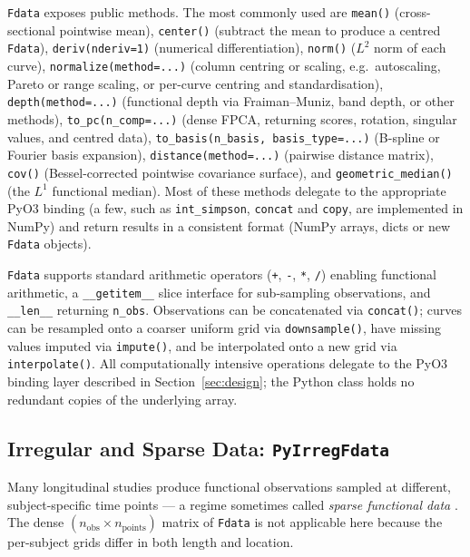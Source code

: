 \texttt{Fdata} exposes \nfdata{} public methods.  The most commonly used are
\texttt{mean()} (cross-sectional pointwise mean), \texttt{center()} (subtract
the mean to produce a centred \texttt{Fdata}), \texttt{deriv(nderiv=1)}
(numerical differentiation), \texttt{norm()} ($L^2$ norm of each curve),
\texttt{normalize(method=...)} (column centring or scaling, e.g.\
autoscaling, Pareto or range scaling, or per-curve centring and
standardisation), \texttt{depth(method=...)}
(functional depth via Fraiman--Muniz, band depth, or other methods),
\texttt{to\_pc(n\_comp=...)} (dense FPCA, returning scores, rotation, singular
values, and centred data), \texttt{to\_basis(n\_basis, basis\_type=...)} (B-spline or Fourier basis
expansion),
\texttt{distance(method=...)} (pairwise distance matrix), \texttt{cov()} (Bessel-corrected
pointwise covariance surface), and \texttt{geometric\_median()} (the $L^1$ functional
median).  Most of these methods delegate to the appropriate PyO3 binding
(a few, such as \texttt{int\_simpson}, \texttt{concat} and \texttt{copy}, are
implemented in NumPy) and return results in a consistent format (NumPy arrays,
dicts or new \texttt{Fdata} objects).

\texttt{Fdata} supports standard arithmetic operators (\texttt{+},
\texttt{-}, \texttt{*}, \texttt{/}) enabling functional arithmetic, a
\texttt{\_\_getitem\_\_} slice interface for sub-sampling observations, and
\texttt{\_\_len\_\_} returning \texttt{n\_obs}.  Observations can be
concatenated via \texttt{concat()}; curves can be resampled onto a coarser
uniform grid via \texttt{downsample()}, have missing values imputed via
\texttt{impute()}, and be interpolated onto a new grid via
\texttt{interpolate()}.  All computationally intensive operations delegate to
the PyO3 binding layer described in Section~\ref{sec:design}; the Python class
holds no redundant copies of the underlying array.

\subsection{Irregular and Sparse Data: \texttt{PyIrregFdata}}
\label{subsec:irreg}

Many longitudinal studies produce functional observations sampled at different,
subject-specific time points --- a regime sometimes called \emph{sparse
functional data} \citep{yao_muller_wang_2005}.  The dense
$(n_\mathrm{obs} \times n_\mathrm{points})$ matrix of \texttt{Fdata} is not
applicable here because the per-subject grids differ in both length and
location.

